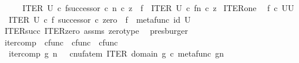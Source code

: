 \begin{isabellebody}
\ \ \isamarkupfalse%
\ \isamarkupfalse%
\ {\isachardoublequoteopen}{\isacharparenleft}{\kern0pt}ITER\ U\ {\isasymcirc}\isactrlsub c\ {\isasymlangle}f{\isacharcomma}{\kern0pt}successor\ {\isasymcirc}\isactrlsub c\ n{\isasymrangle}{\isacharparenright}{\kern0pt}\ {\isasymcirc}\isactrlsub c\ z\ {\isacharequal}{\kern0pt}\ {\isacharparenleft}{\kern0pt}f\ {\isasymbox}\ ITER\ U\ {\isasymcirc}\isactrlsub c\ {\isasymlangle}f{\isacharcomma}{\kern0pt}n{\isasymrangle}{\isacharparenright}{\kern0pt}\ {\isasymcirc}\isactrlsub c\ z{\isachardoublequoteclose}\isacommand{{\isachardot}{\kern0pt}}\isamarkupfalse%
\isanewline
{}\isamarkupfalse%
%
\endisatagproof
{\isafoldproof}%
%
\isadelimproof
\isanewline
%
\endisadelimproof
\isanewline
{}\isamarkupfalse%
\ ITER{\isacharunderscore}{\kern0pt}one{\isacharcolon}{\kern0pt}\isanewline
\ \ {\isachardoublequoteopen}f\ {\isasymin}\isactrlsub c\ {\isacharparenleft}{\kern0pt}U\isactrlbsup U\isactrlesup {\isacharparenright}{\kern0pt}{\isachardoublequoteclose}\isanewline
\ \ {\isachardoublequoteopen}ITER\ U\ {\isasymcirc}\isactrlsub c\ {\isasymlangle}f{\isacharcomma}{\kern0pt}\ successor\ {\isasymcirc}\isactrlsub c\ zero{\isasymrangle}\ {\isacharequal}{\kern0pt}\ f\ {\isasymbox}\ {\isacharparenleft}{\kern0pt}metafunc\ {\isacharparenleft}{\kern0pt}id\ U{\isacharparenright}{\kern0pt}{\isacharparenright}{\kern0pt}{\isachardoublequoteclose}\isanewline
%
\isadelimproof
\ \ %
\endisadelimproof
%
\isatagproof
{}\isamarkupfalse%
\ ITER{\isacharunderscore}{\kern0pt}succ\ ITER{\isacharunderscore}{\kern0pt}zero{\isacharprime}{\kern0pt}\ assms\ zero{\isacharunderscore}{\kern0pt}type\ \isamarkupfalse%
\ presburger%
\endisatagproof
{\isafoldproof}%
%
\isadelimproof
\isanewline
%
\endisadelimproof
\isanewline
{}\isamarkupfalse%
\ iter{\isacharunderscore}{\kern0pt}comp\ {\isacharcolon}{\kern0pt}{\isacharcolon}{\kern0pt}\ {\isachardoublequoteopen}cfunc\ {\isasymRightarrow}\ cfunc\ {\isasymRightarrow}\ cfunc{\isachardoublequoteclose}\ {\isacharparenleft}{\kern0pt}{\isachardoublequoteopen}{\isacharunderscore}{\kern0pt}\isactrlbsup {\isasymcirc}{\isacharunderscore}{\kern0pt}\ \isanewline
\ \ {\isachardoublequoteopen}iter{\isacharunderscore}{\kern0pt}comp\ g\ n\ \ {\isasymequiv}\ cnufatem\ {\isacharparenleft}{\kern0pt}ITER\ {\isacharparenleft}{\kern0pt}domain\ g{\isacharparenright}{\kern0pt}\ {\isasymcirc}\isactrlsub c\ {\isasymlangle}metafunc\ g{\isacharcomma}{\kern0pt}n{\isasymrangle}{\isacharparenright}{\kern0pt}{\isachardoublequoteclose}\isanewline

\end{isabellebody}
